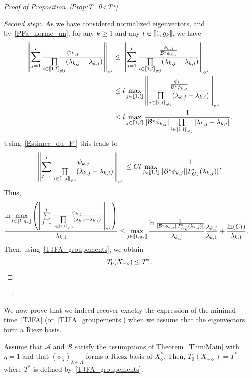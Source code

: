 \documentclass[10pt]{amsart}
\theoremstyle{definition}\newtheorem{defi}[theo]{Definition}\newtheorem{rema}[theo]{Remark}\newtheorem{exam}[theo]{Example}\newtheorem{exem}[theo]{Example}\newtheorem{nota}[theo]{Notation}
\newenvironment{step}[1]{\begin{proof}[#1]}{\let\qed\relax\end{proof}}
\newcommand{\llbracket}{\mathopen{[\mkern -2.7mu[}}
\newcommand{\rrbracket}{\mathclose{]\mkern -2.7mu]}}
\newcommand{\inter}[2]{\llbracket #1,#2 \rrbracket}
\newcommand{\interexclu}[3]{\llbracket #1,#2\rrbracket_{\neq #3}}
\newcommand\A{\mathcal{A}}
\newcommand\B{\mathcal{B}}
\newcommand\Bs{\mathcal{B}^*}
\newcommand{\Xalphas}{X_\diamond^*}
\newcommand{\Xmalpha}{X_{-\diamond}}
\newcommand{\normeXalphas}[1]{\left\| #1 \right\|_{\diamond^*}}
\newcommand{\n}{g}
\newenvironment{proofc}[1][\proofname]{\begin{proof}[{#1}]}{\end{proof}}
\begin{document}
\begin{proofc}[{Proof of Proposition~\ref{Prop:T_0<T*}}]
\begin{step}{Second step:}
As we have considered normalized eigenvectors, and by~\eqref{PFa_norme_un}, for any $k \geq 1$ and any $l\in \inter{1}{\n_k}$, we have
\begin{align*}
\normeXalphas{ \sum\limits_{j=1}^l \frac{ \psi_{k,j} }{\prod\limits_{i\in \interexclu{1}{l}{j}} (\lambda_{k,j}-\lambda_{k,i})} } & \leq \normeXalphas{ \sum\limits_{j=1}^l \frac{ \frac{\phi_{k,j}}{\Bs \phi_{k,j}}}{\prod\limits_{i\in \interexclu{1}{l}{j}} (\lambda_{k,j}-\lambda_{k,i})} }
\\
&\leq l\max\limits_{j\in \inter{1}{l}} \normeXalphas{ \frac{ \frac{\phi_{k,j}}{\Bs \phi_{k,j}}}{\prod\limits_{i\in \interexclu{1}{l}{j}} (\lambda_{k,j}-\lambda_{k,i})} }
\\
&\leq l \max_{j\in \inter{1}{l}} \frac{1}{ | \Bs \phi_{k,j} | \prod\limits_{i\in \interexclu{1}{l}{j}}|\lambda_{k,j}-\lambda_{k,i} |}.
\end{align*}
Using~\eqref{Estimee_du_P'} this leads to
\begin{equation*}
\normeXalphas{ \sum\limits_{j=1}^l \frac{ \psi_{k,j} }{\prod\limits_{i\in \interexclu{1}{l}{j}} (\lambda_{k,j}-\lambda_{k,i})} }
\leq Cl \max_{j\in \inter{1}{l}} \frac{1}{ | \Bs \phi_{k,j} | | P_{G_k}'(\lambda_{k,j}) | }.
\end{equation*}
Thus,
\begin{align*}
\frac{\ln \max\limits_{l\in\inter{1}{\n_k}} \left(
\normeXalphas{ \sum\limits_{j=1}^l \frac{ \psi_{k,j} }{\prod\limits_{i\in \interexclu{1}{l}{j}} (\lambda_{k,j}-\lambda_{k,i})} }
\right) }{\lambda_{k,1}} &\leq \max_{j\in \inter{1}{\n_k}} \frac{\ln \frac{1}{ | \Bs \phi_{k,j} | | P_{G_k}'(\lambda_{k,j}) | }}{ \lambda _{k,j} } \frac{\lambda_{k,j}}{\lambda_{k,1} }+ \frac{\ln(C l)}{\lambda_{k,1}}.
\end{align*}
Then, using~\eqref{TJFA_groupements}, we obtain
\[
T_{0}(\Xmalpha)\leq T^*.\qedhere
\]
\end{step}\let\qed\relax
\end{proofc}


We now prove that we indeed recover exactly the expression of the minimal time~\eqref{TJFA} (or~\eqref{TJFA_groupements}) when we assume that the eigenvectors form a Riesz basis.

\begin{prop}\label{Prop:T_0>T*}
Assume that $\A$ and $\B$ satisfy the assumptions of Theorem~\ref{Thm:Main} with $\eta=1$ and that $(\phi_\lambda)_{\lambda\in \Lambda}$ forms a Riesz basis of $\Xalphas$. Then, $T_0(\Xmalpha)=T^*$ where $T^*$ is defined by~\eqref{TJFA_groupements}.
\end{prop}
\end{document}
